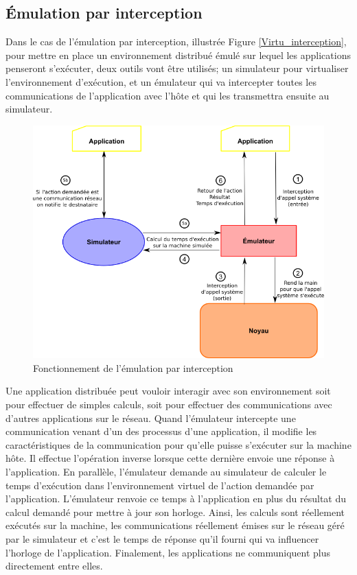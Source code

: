 \subsection{Émulation par interception}
\label{section:interception}

Dans le cas de l'émulation par interception, illustrée
Figure \ref{Virtu_interception}, pour mettre en place un environnement distribué
émulé sur lequel les applications penseront s'exécuter, deux outils vont être
utilisés; un simulateur pour virtualiser l'environnement d'exécution, et un
émulateur qui va intercepter toutes les communications de l'application avec l'hôte
et qui les transmettra ensuite au simulateur.

 \begin{figure}[H]
   \centering \includegraphics[scale=0.5]{Pictures/png/Emulation_fonctionnement}
   \caption{Fonctionnement de l'émulation par interception}
   \label{INTERCEPTION}
 \end{figure}
 
 Une application distribuée peut vouloir interagir avec son environnement soit
 pour effectuer de simples calculs, soit pour effectuer des communications avec
 d'autres applications sur le réseau. Quand l'émulateur intercepte une
 communication venant d'un des processus d'une application, il modifie les
 caractéristiques de la communication pour qu'elle puisse s'exécuter sur la
 machine hôte. Il effectue l'opération inverse lorsque cette dernière envoie une
 réponse à l'application. En parallèle, l'émulateur demande au simulateur de
 calculer le temps d'exécution dans l'environnement virtuel de l'action demandée
 par l'application. L'émulateur renvoie ce temps à l'application en plus du
 résultat du calcul demandé pour mettre à jour son horloge. Ainsi, les calculs
 sont réellement exécutés sur la machine, les communications réellement émises
 sur le réseau géré par le simulateur et c'est le temps de réponse qu'il fourni
 qui va influencer l'horloge de l'application. Finalement, les applications ne
 communiquent plus directement entre elles.

\vspace{0.5cm}
